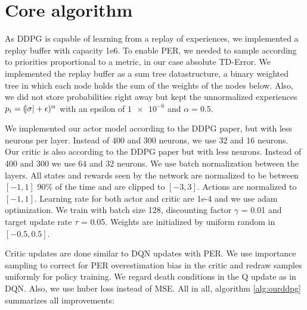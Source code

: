 \documentclass[hyperref,beleg]{cgvpub}
\begin{document}
\section{Core algorithm}

As DDPG is capable of learning from a replay of experiences, we implemented a replay buffer with capacity 1e6. To enable \ac{PER}, we needed to sample according to priorities proportional to a metric, in our case absolute \ac{TD-Error}. We implemented the replay buffer as a sum tree datastructure, a binary weighted tree in which each node holds the sum of the weights of the nodes below.  Also, we did not store probabilities right away but kept the unnormalized experiences $p_i = (\abs{\sigma} + \epsilon)^{\alpha}$ with an epsilon of $\num{1e-6}$ and $\alpha = 0.5$. 

We implemented our actor model according to the \ac{DDPG} paper, but with less neurons per layer. Instead of 400 and 300 neurons, we use 32 and 16 neurons. Our critic is also according to the \ac{DDPG} paper but with less neurons. Instead of 400 and 300 we use 64 and 32 neurons. We use batch normalization between the layers. All states and rewards seen by the network are normalized to be between $[-1, 1]$ 90\% of the time and are clipped to $[-3, 3]$. Actions are normalized to $[-1, 1]$. Learning rate for both actor and critic are 1e-4 and we use adam optimization. We train with batch size 128, discounting factor $\gamma$ = 0.01 and target update rate $\tau$ = 0.05. Weights are initialized by uniform random in $[-0.5, 0.5]$.

Critic updates are done similar to \ac{DQN} updates with \ac{PER}. We use importance sampling to correct for \ac{PER} overestimation bias in the critic and redraw samples uniformly for policy training. We regard death conditions in the Q update as in \ac{DQN}. Also, we use huber loss instead of MSE. All in all, algorithm \ref{alg:ourddpg} summarizes all improvements:
\end{document}

